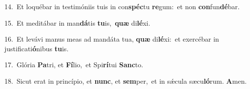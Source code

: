 {\numbfont\textcolor{\numbcolor}{14.}}~Et loquébar in testimóniis tuis in con\-\textbf{spéc}\-tu \textbf{re}\-gum:~\star et non \textbf{con}\-fun\-\textbf{dé}\-bar.\par
{\numbfont\textcolor{\numbcolor}{15.}}~Et meditábar in man\-\textbf{dá}\-tis \textbf{tu}\-is,~\star \textbf{quæ} di\-\textbf{lé}\-xi.\par
{\numbfont\textcolor{\numbcolor}{16.}}~Et levávi manus meas ad mandáta tua, \textbf{quæ} di\-\textbf{lé}\-xi:~\star et exercébar in justificati\-\textbf{ó}\-nibus \textbf{tu}\-is.\par
{\numbfont\textcolor{\numbcolor}{17.}}~Glória \textbf{Pa}\-tri, et \textbf{Fí}\-lio,~\star et Spi\-\textbf{rí}\-tui \textbf{Sanc}\-to.\par
{\numbfont\textcolor{\numbcolor}{18.}}~Sicut erat in princípio, et \textbf{nunc}\-, et \textbf{sem}\-per,~\star et in sǽcula sæcu\-\textbf{ló}\-rum. \textbf{A}\-men.\par
